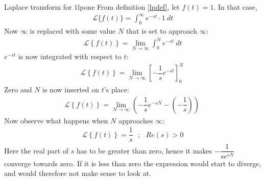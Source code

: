 \begin{example}{Laplace transform for $1$}{lpone}
From definition \ref{lpdef}, let $f(t)=1$. In that case,
\begin{align*}
\mathcal{L}\{f(t)\}=\int_{0}^{\infty} e^{-st} \cdot 1\ dt
\end{align*}
Now $\infty$ is replaced with some value $N$ that is set to approach $\infty$:
\begin{align*}
\mathcal{L} \left\{f(t) \right\}= \lim_{N \to \infty}  \int_{0}^{N} e^{-st}\ dt
\end{align*}
$e^{-st}$ is now integrated with respect to $t$:
\begin{align*}
\mathcal{L} \left\{f(t) \right\}= \lim_{N \to \infty} \left[ -\dfrac{1}{s} e^{-st} \right]_{0}^{N} \ 
\end{align*}
Zero and $N$ is now inserted on $t$’s place:
\begin{align*}
\mathcal{L} \left\{f(t) \right\}= \lim_{N \to \infty} \left( -\dfrac{1}{s} e^{-sN} - \left(-\dfrac{1}{s}\right) \right) \ 
\end{align*}
Now observe what happens when $N$ approaches $\infty$:
\begin{align*}
\mathcal{L} \left\{f(t) \right\}=\dfrac{1}{s} \ \ \ ; \ \ \ Re(s) > 0
\end{align*}
Here the real part of $s$ has to be greater than zero, hence it makes $-\dfrac{1}{se^{sN}}$ converge towards zero. If it is less than zero the expression would start to diverge, and would therefore not make sense to look at.
\end{example}

